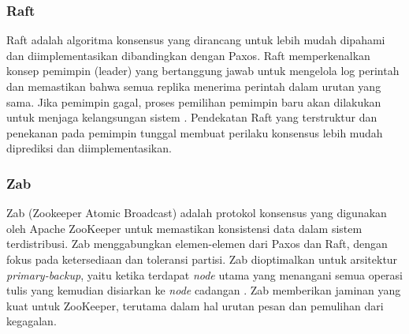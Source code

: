 \subsubsection{Raft}

Raft adalah algoritma konsensus yang dirancang untuk lebih mudah dipahami dan diimplementasikan dibandingkan dengan Paxos. Raft memperkenalkan konsep pemimpin (leader) yang bertanggung jawab untuk mengelola log perintah dan memastikan bahwa semua replika menerima perintah dalam urutan yang sama. Jika pemimpin gagal, proses pemilihan pemimpin baru akan dilakukan untuk menjaga kelangsungan sistem \parencite{ongaro2014search}. Pendekatan Raft yang terstruktur dan penekanan pada pemimpin tunggal membuat perilaku konsensus lebih mudah diprediksi dan diimplementasikan.

\subsubsection{Zab}

Zab (Zookeeper Atomic Broadcast) adalah protokol konsensus yang digunakan oleh Apache ZooKeeper untuk memastikan konsistensi data dalam sistem terdistribusi. Zab menggabungkan elemen-elemen dari Paxos dan Raft, dengan fokus pada ketersediaan dan toleransi partisi. Zab dioptimalkan untuk arsitektur \textit{primary-backup}, yaitu ketika terdapat \textit{node} utama yang menangani semua operasi tulis yang kemudian disiarkan ke \textit{node} cadangan \parencite{junqueira2011zab}. Zab memberikan jaminan yang kuat untuk ZooKeeper, terutama dalam hal urutan pesan dan pemulihan dari kegagalan.
